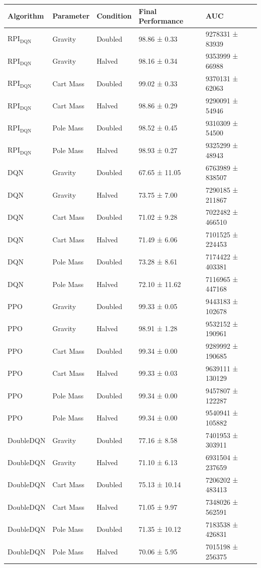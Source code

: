 \begin{tabular}{lllll}
\toprule
Algorithm & Parameter & Condition & Final Performance & AUC \\
\midrule
RPI$_{\mathrm{DQN}}$ & Gravity & Doubled & 98.86 ± 0.33 & 9278331 ± 83939 \\
RPI$_{\mathrm{DQN}}$ & Gravity & Halved & 98.16 ± 0.34 & 9353999 ± 66988 \\
RPI$_{\mathrm{DQN}}$ & Cart Mass & Doubled & 99.02 ± 0.33 & 9370131 ± 62063 \\
RPI$_{\mathrm{DQN}}$ & Cart Mass & Halved & 98.86 ± 0.29 & 9290091 ± 54946 \\
RPI$_{\mathrm{DQN}}$ & Pole Mass & Doubled & 98.52 ± 0.45 & 9310309 ± 54500 \\
RPI$_{\mathrm{DQN}}$ & Pole Mass & Halved & 98.93 ± 0.27 & 9325299 ± 48943 \\
DQN & Gravity & Doubled & 67.65 ± 11.05 & 6763989 ± 838507 \\
DQN & Gravity & Halved & 73.75 ± 7.00 & 7290185 ± 211867 \\
DQN & Cart Mass & Doubled & 71.02 ± 9.28 & 7022482 ± 466510 \\
DQN & Cart Mass & Halved & 71.49 ± 6.06 & 7101525 ± 224453 \\
DQN & Pole Mass & Doubled & 73.28 ± 8.61 & 7174422 ± 403381 \\
DQN & Pole Mass & Halved & 72.10 ± 11.62 & 7116965 ± 447168 \\
PPO & Gravity & Doubled & 99.33 ± 0.05 & 9443183 ± 102678 \\
PPO & Gravity & Halved & 98.91 ± 1.28 & 9532152 ± 190961 \\
PPO & Cart Mass & Doubled & 99.34 ± 0.00 & 9289992 ± 190685 \\
PPO & Cart Mass & Halved & 99.33 ± 0.03 & 9639111 ± 130129 \\
PPO & Pole Mass & Doubled & 99.34 ± 0.00 & 9457807 ± 122287 \\
PPO & Pole Mass & Halved & 99.34 ± 0.00 & 9540941 ± 105882 \\
DoubleDQN & Gravity & Doubled & 77.16 ± 8.58 & 7401953 ± 303911 \\
DoubleDQN & Gravity & Halved & 71.10 ± 6.13 & 6931504 ± 237659 \\
DoubleDQN & Cart Mass & Doubled & 75.13 ± 10.14 & 7206202 ± 483413 \\
DoubleDQN & Cart Mass & Halved & 71.05 ± 9.97 & 7348026 ± 562591 \\
DoubleDQN & Pole Mass & Doubled & 71.35 ± 10.12 & 7183538 ± 426831 \\
DoubleDQN & Pole Mass & Halved & 70.06 ± 5.95 & 7015198 ± 256375 \\
\bottomrule
\end{tabular}
